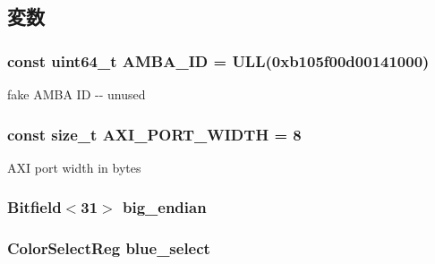 \subsection{変数}
\hypertarget{classHDLcd_ae438dff5177bb7a98567cd94061edab4}{
\subsubsection[{AMBA\_\-ID}]{\setlength{\rightskip}{0pt plus 5cm}const uint64\_\-t {\bf AMBA\_\-ID} = ULL(0xb105f00d00141000)}}
\label{classHDLcd_ae438dff5177bb7a98567cd94061edab4}
fake AMBA ID -\/-\/ unused \hypertarget{classHDLcd_a707d5982e8851aee47eb1250db1c4c3b}{
\subsubsection[{AXI\_\-PORT\_\-WIDTH}]{\setlength{\rightskip}{0pt plus 5cm}const size\_\-t {\bf AXI\_\-PORT\_\-WIDTH} = 8}}
\label{classHDLcd_a707d5982e8851aee47eb1250db1c4c3b}
AXI port width in bytes \hypertarget{classHDLcd_adba5c1ae8473b445f9be0125676b2852}{
\subsubsection[{big\_\-endian}]{\setlength{\rightskip}{0pt plus 5cm}Bitfield$<$31$>$ {\bf big\_\-endian}}}
\label{classHDLcd_adba5c1ae8473b445f9be0125676b2852}
\hypertarget{classHDLcd_af7a5fa704ed84e7d98a264c3ddd8b794}{
\subsubsection[{blue\_\-select}]{\setlength{\rightskip}{0pt plus 5cm}ColorSelectReg {\bf blue\_\-select}}}
\label{classHDLcd_af7a5fa704ed84e7d98a264c3ddd8b794}
